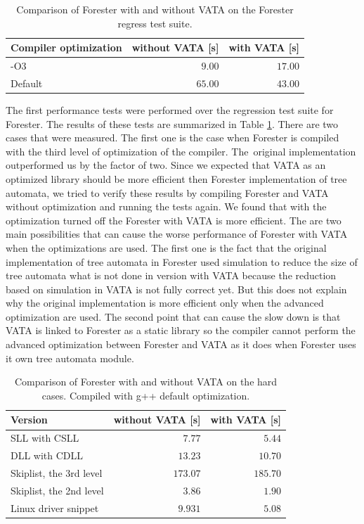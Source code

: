 \begin{table}[bt]
	\vskip6pt
	\caption{Comparison of Forester with and without VATA on the Forester regress test suite.
	}
	\centering
	\begin{tabular}{|l | r | r |}
		\hline
		Compiler optimization & without VATA [s] & with VATA [s] \\
		\hline
		\hline
		-O3        & $9.00$ & $17.00$ \\
		\hline
		Default    & $65.00$ & $43.00$ \\
		\hline
	\end{tabular}
	\label{tab:vataregre}
\end{table}

The first performance tests were performed over the regression test suite for Forester.
The results of these tests are summarized in Table \ref{tab:vataregre}.
There are two cases that were measured.
The first one is the case when Forester is compiled with the third level of optimization of the compiler.
The~original implementation outperformed us by the factor of two.
Since we expected that VATA as an optimized library should be more efficient
then Forester implementation of tree automata, we tried to verify these results
by compiling Forester and VATA without optimization and running the tests again.
We found that with the optimization turned off
the Forester with VATA is more efficient.
The are two main possibilities that can cause the worse performance of Forester with VATA
when the optimizations are used.
The first one is the fact that the original implementation of tree automata
in Forester used simulation to reduce the size of tree automata
what is not done in version with VATA because the reduction based on simulation in VATA is not fully correct yet.
But this does not explain why the original implementation is more efficient
only when the advanced optimization are used.
The second point that can cause the slow down is
that VATA is linked to Forester as a static library so the compiler cannot
perform the advanced optimization between Forester and VATA as it does
when Forester uses it own tree automata module.


\begin{table}[bt]
	\vskip6pt
	\caption{Comparison of Forester with and without VATA on the hard cases.
		Compiled with g++ default optimization.
	}
	\centering
	\begin{tabular}{|l | r | r |}
		\hline
		Version & without VATA [s] & with VATA [s] \\
		\hline
		\hline
		SLL with CSLL            & $7.77$ & $5.44$ \\
		\hline
		DLL with CDLL            & $13.23$ & $10.70$ \\
		\hline
		Skiplist, the 3rd level  & $173.07$ & $185.70$ \\
		\hline
		Skiplist, the 2nd level  & $3.86$ & $1.90$ \\
		\hline
		Linux driver snippet     & $9.931$ & $5.08$  \\ 
		\hline
	\end{tabular}
	\label{tab:vatadef}
\end{table}

